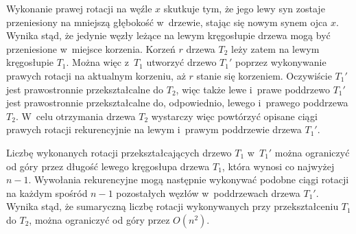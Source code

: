 Wykonanie prawej rotacji na węźle $x$ skutkuje tym, że jego lewy syn zostaje przeniesiony na mniejszą głębokość w~drzewie, stając się nowym synem ojca $x$.
Wynika stąd, że jedynie węzły leżące na lewym kręgosłupie drzewa mogą być przeniesione w~miejsce korzenia.
Korzeń $r$ drzewa $T_2$ leży zatem na lewym kręgosłupie $T_1$.
Można więc z~$T_1$ utworzyć drzewo $T_1'$ poprzez wykonywanie prawych rotacji na aktualnym korzeniu, aż $r$ stanie się korzeniem.
Oczywiście $T_1'$ jest prawostronnie przekształcalne do $T_2$, więc także lewe i~prawe poddrzewo $T_1'$ jest prawostronnie przekształcalne do, odpowiednio, lewego i~prawego poddrzewa $T_2$.
W~celu otrzymania drzewa $T_2$ wystarczy więc powtórzyć opisane ciągi prawych rotacji rekurencyjnie na lewym i~prawym poddrzewie drzewa $T_1'$.

Liczbę wykonanych rotacji przekształcających drzewo $T_1$ w~$T_1'$ można ograniczyć od góry przez długość lewego kręgosłupa drzewa $T_1$, która wynosi co najwyżej $n-1$.
Wywołania rekurencyjne mogą następnie wykonywać podobne ciągi rotacji na każdym spośród $n-1$ pozostałych węzłów w~poddrzewach drzewa $T_1'$.
Wynika stąd, że sumaryczną liczbę rotacji wykonywanych przy przekształceniu $T_1$ do $T_2$, można ograniczyć od góry przez $O(n^2)$.
